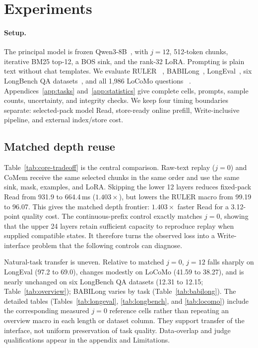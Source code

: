 \section{Experiments}
\label{sec:experiments}

\paragraph{Setup.}
The principal model is frozen Qwen3-8B~\citep{qwen3}, with $j{=}12$,
512-token chunks, iterative BM25 top-12, a BOS sink, and the rank-32 LoRA.
Prompting is plain text without chat templates. We evaluate RULER
~\citep{ruler}, BABILong~\citep{babilong}, LongEval~\citep{longchat}, six
LongBench QA datasets~\citep{longbench}, and all 1,986 LoCoMo questions
~\citep{locomo}. Appendices~\ref{app:tasks} and~\ref{app:statistics} give
complete cells, prompts, sample counts, uncertainty, and integrity checks. We keep four
timing boundaries separate: selected-pack model Read, store-ready online
prefill, Write-inclusive pipeline, and external index/store cost.

\subsection{Matched depth reuse}


Table~\ref{tab:core-tradeoff} is the central comparison. Raw-text replay
($j{=}0$) and CoMem receive the same selected chunks in the same order and use
the same sink, mask, examples, and LoRA. Skipping the lower 12 layers reduces
fixed-pack Read from 931.9 to 664.4\,ms ($1.403\times$), but lowers the RULER
macro from 99.19 to 96.07. This gives the matched depth frontier: $1.403\times$ faster Read for a
3.12-point quality cost. The continuous-prefix control exactly matches $j{=}0$,
showing that the upper 24 layers retain sufficient capacity to reproduce replay
when supplied compatible states. It therefore turns the observed loss into a
Write-interface problem that the following controls can diagnose.

Natural-task transfer is uneven. Relative to matched $j{=}0$, $j{=}12$
falls sharply on LongEval (97.2 to 69.0), changes modestly on LoCoMo (41.59 to
38.27), and is nearly unchanged on six LongBench QA datasets (12.31 to 12.15;
Table~\ref{tab:overview}); BABILong varies by task
(Table~\ref{tab:babilong}). The detailed tables
(Tables~\ref{tab:longeval}, \ref{tab:longbench}, and \ref{tab:locomo}) include
the corresponding measured $j{=}0$ reference cells rather than repeating an
overview macro in each length or dataset column. They support transfer of the
interface, not uniform preservation of task quality.
Data-overlap and judge qualifications appear in the appendix and Limitations.

